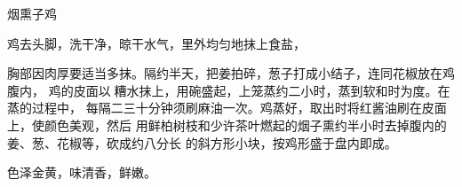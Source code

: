\begin{recipe}{烟熏子鸡}

\ingredients


\preparation

鸡去头脚，洗干净，晾干水气，里外均匀地抹上食盐，

胸部因肉厚要适当多抹。隔约半天，把姜拍碎，葱子打成小结子，连同花椒放在鸡腹内，
鸡的皮面以𰪿糟水抹上，用碗盛起，上笼蒸约二小时，蒸到软和时为度。在蒸的过程中，
每隔二三十分钟须刷麻油一次。鸡蒸好，取出时将红酱油刷在皮面上，使颜色美观，然后
用鲜柏树枝和少许茶叶燃起的烟子熏约半小时去掉腹内的姜、葱、花椒等，砍成约八分长
的斜方形小块，按鸡形盛于盘内即成。

\features

色泽金黄，味清香，鲜嫩。

\end{recipe}

